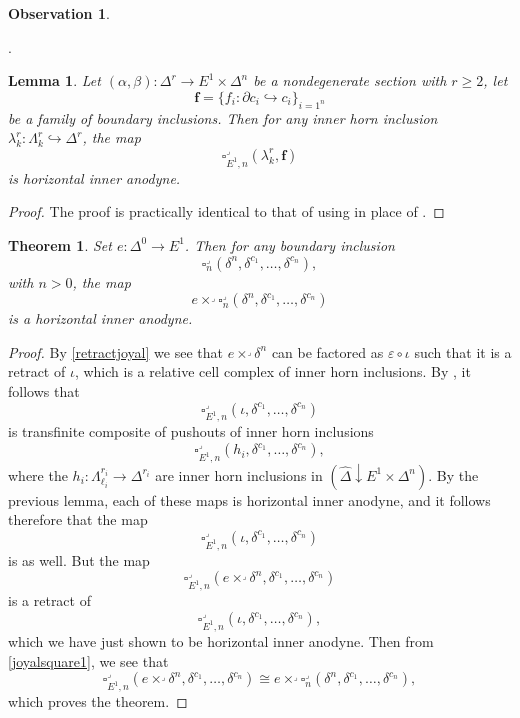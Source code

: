 \documentclass[a4paper]{article}
\numberwithin{equation}{subsection}
\theoremstyle{plain}   %
\newtheorem{thm}[equation]{Theorem}
\newtheorem{lemma}[equation]{Lemma}
\theoremstyle{definition}
\newtheorem{obs}[equation]{Observation}
\theoremstyle{remark}
\theoremstyle{plain}
\DeclareMathOperator{\id}{id}
\newcommand{\overcat}[2]{{\left(#1\downarrow #2\right)}}
\newcommand{\psh}[1]{\ensuremath{\widehat{#1}}}
\providecommand{\C}{}
\renewcommand{\C}{\ensuremath{\mathcal{C}}}
\newcommand{\cellset}{\ensuremath{\widehat{\Theta[\mathcal{C}]}}}
\begin{document}
\begin{obs}
\begin{center}
.
	\end{center}
\end{obs}
\begin{lemma}
	Let \((\alpha,\beta): \Delta^r \to E^1\times \Delta^n\) be a nondegenerate section with \(r\geq 2\), let \[\mathbf{f}=\{f_i:\partial c_i \hookrightarrow c_i\}_{i=1^n}\] be a family of boundary inclusions.  Then for any inner horn inclusion \(\lambda^r_k: \Lambda^r_k\hookrightarrow \Delta^r\), the map
	\[
		\square_{E^1,n}^\lrcorner(\lambda^r_k, \mathbf{f})
	\]
	is horizontal inner anodyne.
\end{lemma}
\begin{proof}
	The proof is practically identical to that of  using  in place of .  
\end{proof}
\begin{thm}\label{joyalisothm}
	Set \(e:\Delta^0\to E^1\). Then for any boundary inclusion 
	\[\square_n^\lrcorner(\delta^n,\delta^{c_1},\dots,\delta^{c_n}),\]
	with \(n>0\), the map 
	\[e \times^\lrcorner \square_n^\lrcorner(\delta^n,\delta^{c_1},\dots,\delta^{c_n})\]
	is a horizontal inner anodyne.
\end{thm}
\begin{proof}
	By \ref{retractjoyal} we see that \(e\times^\lrcorner \delta^n\) can be factored as \(\varepsilon\circ \iota\) such that it is a retract of \(\iota\), which is a relative cell complex of inner horn inclusions.  By , it follows that 
	\[
		\square^\lrcorner_{E^1,n}(\iota, \delta^{c_1},\dots,\delta^{c_n})
	\]
	is transfinite composite of pushouts of inner horn inclusions
	\[
		\square^\lrcorner_{E^1,n}(h_i, \delta^{c_1},\dots,\delta^{c_n}),
	\]
	where the \(h_i:\Lambda^{r_i}_{\ell_i}\to \Delta^{r_i}\) are inner horn inclusions in \(\overcat{\psh{\Delta}}{E^1 \times \Delta^n}\).  By the previous lemma, each of these maps is horizontal inner anodyne, and it follows therefore that the map
	\[
		\square^\lrcorner_{E^1,n}(\iota, \delta^{c_1},\dots,\delta^{c_n})
	\]
	is as well.  
	But the map
	\[
		\square^\lrcorner_{E^1,n}(e\times^\lrcorner \delta^n, \delta^{c_1},\dots,\delta^{c_n})
	\]
	is a retract of 
	\[
		\square^\lrcorner_{E^1,n}(\iota, \delta^{c_1},\dots,\delta^{c_n}),
	\]
	which we have just shown to be horizontal inner anodyne. Then from \ref{joyalsquare1}, we see that 
	\[
		\square^\lrcorner_{E^1,n}(e\times^\lrcorner \delta^n, \delta^{c_1},\dots,\delta^{c_n}) \cong e \times^\lrcorner \square^\lrcorner_n(\delta^n,\delta^{c_1},\dots,\delta^{c_n}),
	\]
	which proves the theorem.
\end{proof}
\end{document}
